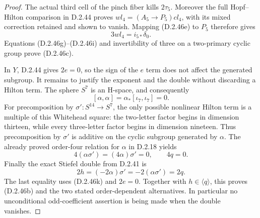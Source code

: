 \begin{proof}
The actual third cell of the pinch fiber kills $2\tau_5$.
Moreover the full Hopf--Hilton comparison in D.2.44 proves
$wl_4=(A_5\to P_5)cl_4$, with its mixed correction retained
and shown to vanish.  Mapping (D.2.46e) to $P_5$ therefore gives
\[
                        3wl_4=i_{5*}\delta_0.
 \tag{D.2.46j}
\]
Equations (D.2.46g)--(D.2.46i) and invertibility of three on a
two-primary cyclic group prove (D.2.46c).

In $Y$, D.2.44 gives $2e=0$, so the sign of the $e$ term
does not affect the generated subgroup.  It remains to justify
the exponent and the double without discarding a Hilton term.
The sphere $S^7$ is an H-space, and consequently
\[
 [\alpha,\alpha]=\alpha_*[\iota_7,\iota_7]=0.
\]
For precomposition by $\sigma':S^{14}\to S^7$, the only
possible nonlinear Hilton term is a multiple of this
Whitehead square: the two-letter factor begins in dimension
thirteen, while every three-letter factor begins in dimension
nineteen.  Thus precomposition by $\sigma'$ is additive on
the cyclic subgroup generated by $\alpha$.  The already
proved order-four relation for $\alpha$ in D.2.18 yields
\[
              4(\alpha\sigma')=(4\alpha)\sigma'=0,
              \qquad 4q=0.
 \tag{D.2.46k}
\]
Finally the exact Stiefel double from D.2.41 is
\[
              2h=(-2\alpha)\sigma'
                 =-2(\alpha\sigma')=2q.
 \tag{D.2.46l}
\]
The last equality uses (D.2.46k) and $2e=0$.
Together with $h\in\langle q\rangle$, this proves
(D.2.46b) and the two stated order-dependent alternatives.
In particular no unconditional odd-coefficient assertion is
being made when the double vanishes.
\end{proof}
